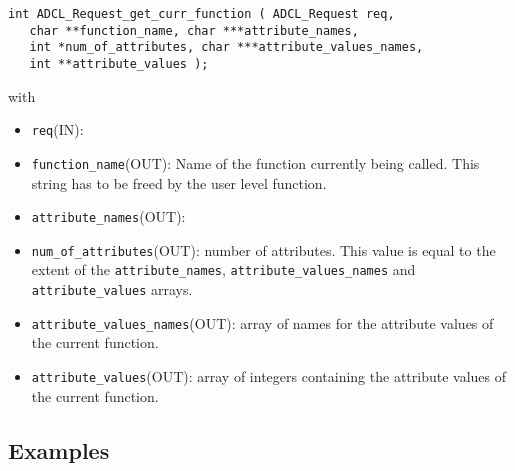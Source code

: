 \begin{verbatim}
int ADCL_Request_get_curr_function ( ADCL_Request req, 
   char **function_name, char ***attribute_names, 
   int *num_of_attributes, char ***attribute_values_names, 
   int **attribute_values );
\end{verbatim}
with
\begin{itemize}
\item {\tt req}(IN):
\item {\tt function\_name}(OUT): Name of the function currently being
  called. This string has to be freed by the user level function.
\item {\tt attribute\_names}(OUT):
\item {\tt num\_of\_attributes}(OUT): number of attributes. This value is equal
  to the extent of the {\tt attribute\_names}, {\tt attribute\_values\_names}
  and {\tt attribute\_values} arrays.
\item {\tt attribute\_values\_names}(OUT): array of names for the attribute values
  of the current function.
\item {\tt attribute\_values}(OUT): array of integers containing the attribute
  values of the current function.
\end{itemize}

  


%    

\subsection{Examples}

